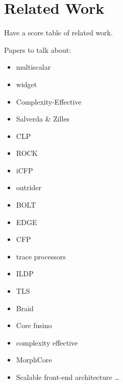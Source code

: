 \section{Related Work}
\label{sec:rel_work}

Have a score table of related work.

Papers to talk about:

\begin{itemize}
    \item \cite{multiscalar} multiscalar
    \item \cite{widget} widget
    \item \cite{complexity} Complexity-Effective
    \item \cite{fundamental} Salverda \& Zilles
    \item \cite{clp} CLP
    \item \cite{rock} ROCK
    \item \cite{icfp} iCFP
    \item \cite{outrider} outrider
    \item \cite{bolt} BOLT
    \item \cite{edge} EDGE
    \item \cite{cfp} CFP
    \item \cite{trace} trace processors
    \item \cite{ildp} ILDP
    \item \cite{tls} TLS
    \item \cite{braid} Braid
    \item \cite{corefusion} Core fusino
    \item \cite{complexity} complexity effective
    \item \cite{morphcore} MorphCore
    \item \cite{scalable_frontend} Scalable front-end architecture
    \ldots
\end{itemize}
